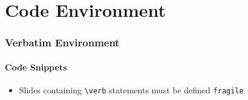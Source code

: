 \section{Code Environment}
\begin{frame}[fragile]
        \frametitle{Verbatim Environment}
        \framesubtitle{Code Snippets}
        \begin{itemize}
      \item Slides containing \verb!\verb! statements must be defined \verb+fragile+
    \end{itemize}
    \scriptsize
    
\end{frame}


